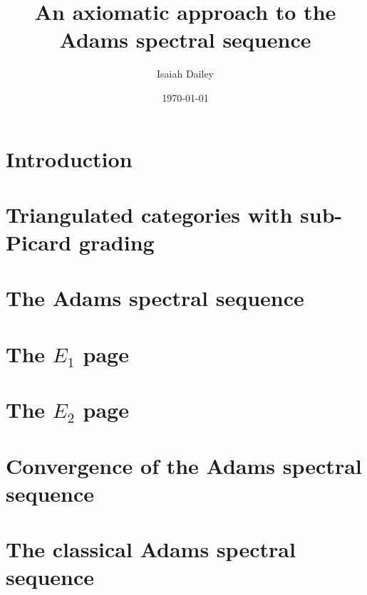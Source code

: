 \documentclass{amsart}
\title{An axiomatic approach to the Adams spectral sequence}
\author{Isaiah Dailey}
\date{\today}
\theoremstyle{plain}
\theoremstyle{definition}
\newcommand{\0}{\mathbf{0}}
\renewcommand{\(}{\left(}
\renewcommand{\)}{\right)}
\newcommand{\1}{\mbf{1}}
\begin{document}
\maketitle

\tableofcontents

\section{Introduction}



\section{Triangulated categories with sub-Picard grading}\label{section:tri_cat_with_sub-picard_grading}



\section{The Adams spectral sequence}



\section{The \texorpdfstring{$E_1$}{E1} page}



\section{The \texorpdfstring{$E_2$}{E2} page}



\section{Convergence of the Adams spectral sequence}



\section{The classical Adams spectral sequence}\label{classical}


\end{document}
